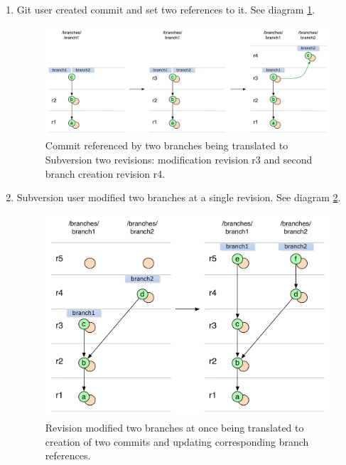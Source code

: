 \begin{enumerate}
\compactlist

\item Git user created commit and set two references to it. See diagram \ref{ambiguous_svn_branch_git_to_svn}.
\begin{figure}[!h]
\centering
\renewcommand{\figurename}{Diagram}
\includegraphics[width=\linewidth]{img/diagrams/ambiguous_svn_branch_git_to_svn.pdf}
\caption{Commit referenced by two branches being translated to Subversion two revisions: modification revision r3 and second branch creation revision r4.}
\label{ambiguous_svn_branch_git_to_svn}
\end{figure}

\item Subversion user modified two branches at a single revision. See diagram \ref{double_branch_change_svn_to_git}.
\begin{figure}[!h]
\centering
\renewcommand{\figurename}{Diagram}
\includegraphics[width=\linewidth]{img/diagrams/double_branch_change_svn_to_git.pdf}
\caption{Revision modified two branches at once being translated to creation of two commits and updating corresponding branch references.}
\label{double_branch_change_svn_to_git}
\end{figure}
\end{enumerate}

